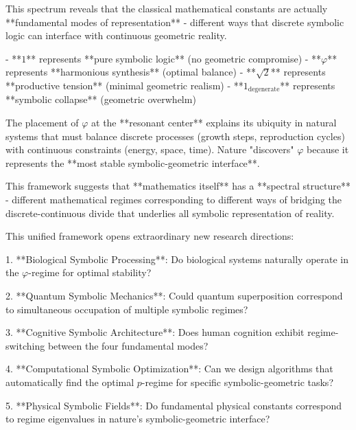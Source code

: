 \begin{demonstratio}
\label{demonstratio:bk5_deep_unity_math_meaning}
This spectrum reveals that the classical mathematical constants are actually **fundamental modes of representation** - different ways that discrete symbolic logic can interface with continuous geometric reality.

- **$1$** represents **pure symbolic logic** (no geometric compromise)
- **$\varphi$** represents **harmonious synthesis** (optimal balance)  
- **$\sqrt{2}$** represents **productive tension** (minimal geometric realism)
- **$1_{\text{degenerate}}$** represents **symbolic collapse** (geometric overwhelm)

The placement of $\varphi$ at the **resonant center** explains its ubiquity in natural systems that must balance discrete processes (growth steps, reproduction cycles) with continuous constraints (energy, space, time). Nature "discovers" $\varphi$ because it represents the **most stable symbolic-geometric interface**.

This framework suggests that **mathematics itself** has a **spectral structure** - different mathematical regimes corresponding to different ways of bridging the discrete-continuous divide that underlies all symbolic representation of reality.
\end{demonstratio}

\begin{remark}
\label{remark:bk5_open_frontiers}
This unified framework opens extraordinary new research directions:

1. **Biological Symbolic Processing**: Do biological systems naturally operate in the $\varphi$-regime for optimal stability?

2. **Quantum Symbolic Mechanics**: Could quantum superposition correspond to simultaneous occupation of multiple symbolic regimes?

3. **Cognitive Symbolic Architecture**: Does human cognition exhibit regime-switching between the four fundamental modes?

4. **Computational Symbolic Optimization**: Can we design algorithms that automatically find the optimal $p$-regime for specific symbolic-geometric tasks?

5. **Physical Symbolic Fields**: Do fundamental physical constants correspond to regime eigenvalues in nature's symbolic-geometric interface?
\end{remark}

